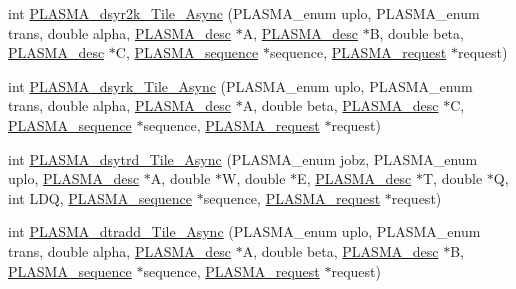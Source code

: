 \begin{DoxyCompactItemize}
\item 
int \hyperlink{group__double__Tile__Async_gaf8b727ed2b6c23dc3ba73cca9f665fea_gaf8b727ed2b6c23dc3ba73cca9f665fea}{P\+L\+A\+S\+M\+A\+\_\+dsyr2k\+\_\+\+Tile\+\_\+\+Async} (P\+L\+A\+S\+M\+A\+\_\+enum uplo, P\+L\+A\+S\+M\+A\+\_\+enum trans, double alpha, \hyperlink{structplasma__desc__t}{P\+L\+A\+S\+M\+A\+\_\+desc} $\ast$A, \hyperlink{structplasma__desc__t}{P\+L\+A\+S\+M\+A\+\_\+desc} $\ast$B, double beta, \hyperlink{structplasma__desc__t}{P\+L\+A\+S\+M\+A\+\_\+desc} $\ast$C, \hyperlink{structplasma__sequence__t}{P\+L\+A\+S\+M\+A\+\_\+sequence} $\ast$sequence, \hyperlink{structplasma__request__t}{P\+L\+A\+S\+M\+A\+\_\+request} $\ast$request)
\item 
int \hyperlink{group__double__Tile__Async_ga531589f792a93346789701b9ba61485f_ga531589f792a93346789701b9ba61485f}{P\+L\+A\+S\+M\+A\+\_\+dsyrk\+\_\+\+Tile\+\_\+\+Async} (P\+L\+A\+S\+M\+A\+\_\+enum uplo, P\+L\+A\+S\+M\+A\+\_\+enum trans, double alpha, \hyperlink{structplasma__desc__t}{P\+L\+A\+S\+M\+A\+\_\+desc} $\ast$A, double beta, \hyperlink{structplasma__desc__t}{P\+L\+A\+S\+M\+A\+\_\+desc} $\ast$C, \hyperlink{structplasma__sequence__t}{P\+L\+A\+S\+M\+A\+\_\+sequence} $\ast$sequence, \hyperlink{structplasma__request__t}{P\+L\+A\+S\+M\+A\+\_\+request} $\ast$request)
\item 
int \hyperlink{group__double__Tile__Async_ga07f0b6fa9fd1812196acdf2b2e252e43_ga07f0b6fa9fd1812196acdf2b2e252e43}{P\+L\+A\+S\+M\+A\+\_\+dsytrd\+\_\+\+Tile\+\_\+\+Async} (P\+L\+A\+S\+M\+A\+\_\+enum jobz, P\+L\+A\+S\+M\+A\+\_\+enum uplo, \hyperlink{structplasma__desc__t}{P\+L\+A\+S\+M\+A\+\_\+desc} $\ast$A, double $\ast$W, double $\ast$E, \hyperlink{structplasma__desc__t}{P\+L\+A\+S\+M\+A\+\_\+desc} $\ast$T, double $\ast$Q, int L\+D\+Q, \hyperlink{structplasma__sequence__t}{P\+L\+A\+S\+M\+A\+\_\+sequence} $\ast$sequence, \hyperlink{structplasma__request__t}{P\+L\+A\+S\+M\+A\+\_\+request} $\ast$request)
\item 
int \hyperlink{group__double__Tile__Async_gab5490de23ac431c6822ac5b06b6be7aa_gab5490de23ac431c6822ac5b06b6be7aa}{P\+L\+A\+S\+M\+A\+\_\+dtradd\+\_\+\+Tile\+\_\+\+Async} (P\+L\+A\+S\+M\+A\+\_\+enum uplo, P\+L\+A\+S\+M\+A\+\_\+enum trans, double alpha, \hyperlink{structplasma__desc__t}{P\+L\+A\+S\+M\+A\+\_\+desc} $\ast$A, double beta, \hyperlink{structplasma__desc__t}{P\+L\+A\+S\+M\+A\+\_\+desc} $\ast$B, \hyperlink{structplasma__sequence__t}{P\+L\+A\+S\+M\+A\+\_\+sequence} $\ast$sequence, \hyperlink{structplasma__request__t}{P\+L\+A\+S\+M\+A\+\_\+request} $\ast$request)
\item 

\end{DoxyCompactItemize}

